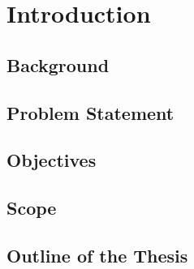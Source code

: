 \chapter{Introduction}
\label{chap:introduction}

\setcounter{section}{0}
\section{Background}
\label{sec:background}


\section{Problem Statement}
\label{sec:problem}


\section{Objectives}
\label{sec:objectives}


\section{Scope}
\label{sec:scope}


\section{Outline of the Thesis}
\label{sec:structure}





